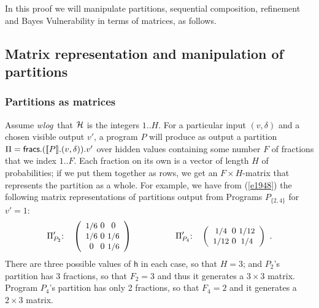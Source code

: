 \documentclass[runningheads]{llncs}
\newcommand\Vh {\mathsf{h}}
\newcommand\Wlog {\textit{wlog}}
\newcommand\Eqn[1] {(\ref{#1})}
\newcommand\HH {{\cal H}}
\newcommand\Sem[1] {[\![#1]\!]}
\begin{document}
In this proof we will manipulate partitions, sequential composition, refinement and Bayes Vulnerability in terms of matrices, as follows.

\subsection{Matrix representation and manipulation of partitions}\label{s1552}

\subsubsection{Partitions as matrices}

Assume \Wlog\ that $\HH$ is the integers $1..H$. For a particular input $(v,\delta)$ and a chosen visible output $v'$, a program $P$ will produce as output a partition $\Pi = \Fracs.(\Sem{P}.(v,\delta)).v'$ over hidden values containing some number $F$ of fractions that we index $1..F$. Each fraction on its own is a vector of length $H$ of probabilities; if we put them together as rows, we get an $F{\times}H$-matrix that represents the partition as a whole. For example, we have from \Eqn{e1948} the following matrix representations of partitions output from Programs $P_{\{2,4\}}$ for $v'{=}1$:
\begin{equation}\label{e1520}
 \Pi_{P_2}'{:}\quad
  \left (\begin{array}{c@{~}c@{~}c}
          \IFrac{1}{6} & 0 &  0 \\
          \IFrac{1}{6} & 0 & \IFrac{1}{6} \\
          0 & 0 & \IFrac{1}{6}
         \end{array}
  \right)
 \hspace{5em}
 \Pi_{P_4}'{:}\quad
  \left (\begin{array}{c@{~}c@{~}c}
          \IFrac{1}{4}  & 0 & \IFrac{1}{12} \\
          \IFrac{1}{12} & 0 & \IFrac{1}{4}\\
         \end{array}
  \right)~.
\end{equation}
There are three possible values of $\Vh$ in each case, so that $H{=}3$; and $P_2$'s partition has 3 fractions, so that $F_2{=}3$ and thus it generates a $3{\times}3$ matrix. Program $P_4$'s partition has only 2 fractions, so that $F_4{=}2$ and it generates a $2{\times}3$ matrix.
\end{document}
